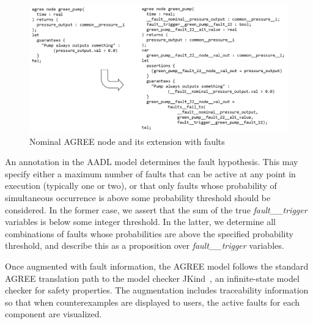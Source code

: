 \begin{figure}
\vspace{-0.1in}
\includegraphics[width=\textwidth]{images/sample_code.png}
\vspace{-0.3in}
\caption{Nominal AGREE node and its extension with faults}
\label{fig:comp}
\end{figure}

An annotation in the AADL model determines the fault hypothesis.  This may specify either a maximum number of faults that can be active at any point in execution (typically one or two), or that only faults whose probability of simultaneous occurrence is above some probability threshold should be considered.  In the former case, we assert that the sum of the true {\em fault\_\_trigger} variables is below some integer threshold.  In the latter, we determine all  combinations of faults whose probabilities are above the specified probability threshold, and describe this as a proposition over {\em fault\_\_trigger} variables.

Once augmented with fault information, the AGREE model follows the standard AGREE translation path to the model checker JKind~\cite{2017arXiv171201222G}, an infinite-state model checker for safety properties.  The augmentation includes traceability information so that when counterexamples are displayed to users, the active faults for each component are visualized.



